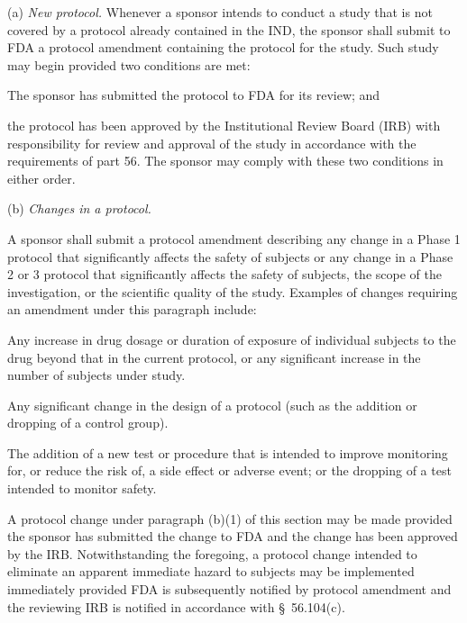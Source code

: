 \documentclass[11pt]{article}
\begin{document}
(a) \textit{New protocol.} Whenever a sponsor intends to conduct a study that is not covered by a protocol already contained in the IND, the sponsor shall submit to FDA a protocol amendment containing the protocol for the study. Such study may begin provided two conditions are met:

\begin{description}[leftmargin=0.5cm,style=sameline]
\item[(1)] The sponsor has submitted the protocol to FDA for its review; and
\item[(2)] the protocol has been approved by the Institutional Review Board (IRB) with responsibility for review and approval of the study in accordance with the requirements of part 56. The sponsor may comply with these two conditions in either order.
\end{description}

(b) \textit{Changes in a protocol.}

\begin{description}[leftmargin=0.5cm,style=sameline]
\item[(1)] A sponsor shall submit a protocol amendment describing any change in a Phase 1 protocol that significantly affects the safety of subjects or any change in a Phase 2 or 3 protocol that significantly affects the safety of subjects, the scope of the investigation, or the scientific quality of the study. Examples of changes requiring an amendment under this paragraph include:
\begin{description}[leftmargin=0.8cm,style=sameline]
\item[(i)] Any increase in drug dosage or duration of exposure of individual subjects to the drug beyond that in the current protocol, or any significant increase in the number of subjects under study.
\item[(ii)] Any significant change in the design of a protocol (such as the addition or dropping of a control group).
\item[(iii)] The addition of a new test or procedure that is intended to improve monitoring for, or reduce the risk of, a side effect or adverse event; or the dropping of a test intended to monitor safety.
\end{description}
\item[(2)] A protocol change under paragraph (b)(1) of this section may be made provided the sponsor has submitted the change to FDA and the change has been approved by the IRB. Notwithstanding the foregoing, a protocol change intended to eliminate an apparent immediate hazard to subjects may be implemented immediately provided FDA is subsequently notified by protocol amendment and the reviewing IRB is notified in accordance with \S~56.104(c).
\end{description}
\end{document}
